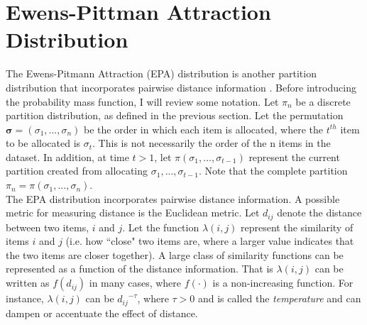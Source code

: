\section{Ewens-Pittman Attraction Distribution}
The Ewens-Pitmann Attraction (EPA) distribution is another partition
distribution that incorporates pairwise distance information \citep{epa}.
Before introducing the probability mass function, I will review some notation.
Let $\pi_n$ be a discrete partition distribution, as defined in the previous
section. Let the permutation $\bm \sigma = (\sigma_1,...,\sigma_n)$ be the
order in which each item is allocated, where the $t^{th}$ item to be allocated
is $\sigma_t$. This is not necessarily the order of the n items in the dataset.
In addition, at time $t > 1$, let $\pi(\sigma_{1},...,\sigma_{t-1})$ represent
the current partition created from allocating $\sigma_{1},...,\sigma_{t-1}$.
Note that the complete partition $\pi_n = \pi(\sigma_{1},...,\sigma_{n})$.\\

\noindent
The EPA distribution incorporates pairwise distance information. A possible
metric for measuring distance is the Euclidean metric. Let $d_{ij}$ denote the
distance between two items, $i$ and $j$. Let the function $\lambda(i,j)$ represent
the similarity of items $i$ and $j$ (i.e. how ``close" two items are, where a larger
value indicates that the two items are closer together). A large class of similarity
functions can be represented as a function of the distance information. That is
$\lambda(i,j)$ can be written as $f(d_{ij})$ in many cases, where $f(\cdot)$ is a
non-increasing function. For instance, $\lambda(i,j)$ can be ${d_{ij}}^{-\tau}$,
where $\tau>0$ and is called the \textit{temperature} and can dampen or
accentuate the effect of distance.\\

